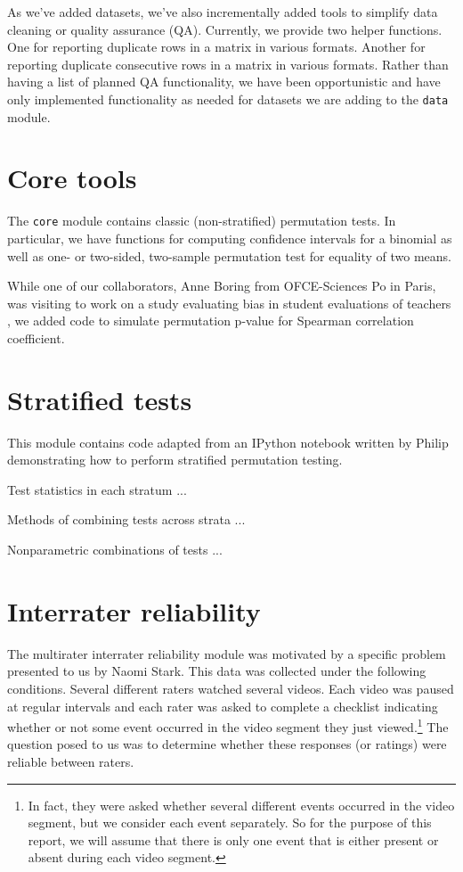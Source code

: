 As we've added datasets, we've also incrementally added tools to simplify data
cleaning or quality assurance (QA).  Currently, we provide two helper
functions.  One for reporting duplicate rows in a matrix in various formats.
Another for reporting duplicate consecutive rows in a matrix in various
formats.  Rather than having a list of planned QA functionality, we have been
opportunistic and have only implemented functionality as needed for datasets we
are adding to the \texttt{data} module.

\section{Core tools}

The \texttt{core} module contains classic (non-stratified) permutation tests.
In particular, we have functions for computing confidence intervals for a
binomial as well as one- or two-sided, two-sample permutation test for equality
of two means.

While one of our collaborators, Anne Boring from OFCE-Sciences Po in Paris, was
visiting to work on a study evaluating bias in student evaluations of teachers
\cite{boring2015}, we added code to simulate permutation p-value for Spearman
correlation coefficient.

\section{Stratified tests}

This module contains code adapted from an IPython notebook written by
Philip demonstrating how to perform stratified permutation testing.

Test statistics in each stratum ...

Methods of combining tests across strata ...

Nonparametric combinations of tests ...

\section{\label{sec:irr}Interrater reliability}

The multirater interrater reliability module was motivated by a specific
problem presented to us by Naomi Stark.  This data was collected under the
following conditions.  Several different raters watched several videos.  Each
video was paused at regular intervals and each rater was asked to complete a
checklist indicating whether or not some event occurred in the video segment
they just viewed.\footnote{In fact, they were asked whether several different
events occurred in the video segment, but we consider each event separately.
So for the purpose of this report, we will assume that there is only one event
that is either present or absent during each video segment.} The question posed
to us was to determine whether these responses (or ratings) were reliable
between raters. 

